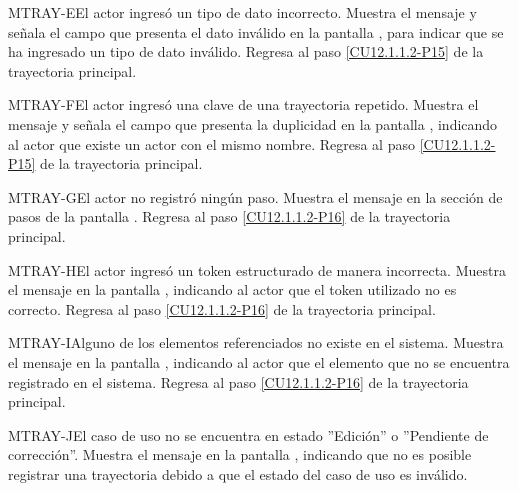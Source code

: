 	\begin{UCtrayectoriaA}{MTRAY-E}{El actor ingresó un tipo de dato incorrecto.}
		\UCpaso[\UCsist] Muestra el mensaje  y señala el campo que presenta el dato inválido en la pantalla , para indicar que se ha ingresado un tipo de dato inválido.
		\UCpaso Regresa al paso \ref{CU12.1.1.2-P15} de la trayectoria principal.
	\end{UCtrayectoriaA}
	
	\begin{UCtrayectoriaA}{MTRAY-F}{El actor ingresó una clave de una trayectoria repetido.}
		\UCpaso[\UCsist] Muestra el mensaje  y señala el campo que presenta la duplicidad en la pantalla , indicando al actor que existe un actor con el mismo nombre.
		\UCpaso Regresa al paso \ref{CU12.1.1.2-P15} de la trayectoria principal.
	\end{UCtrayectoriaA}

	\begin{UCtrayectoriaA}{MTRAY-G}{El actor no registró ningún paso.}
		\UCpaso[\UCsist] Muestra el mensaje  en la sección de pasos de la pantalla .
		\UCpaso Regresa al paso \ref{CU12.1.1.2-P16} de la trayectoria principal.
	\end{UCtrayectoriaA}

	\begin{UCtrayectoriaA}{MTRAY-H}{El actor ingresó un token estructurado de manera incorrecta.}
		\UCpaso[\UCsist] Muestra el mensaje  en la pantalla , indicando al actor que el token utilizado no es correcto.
		\UCpaso Regresa al paso \ref{CU12.1.1.2-P16} de la trayectoria principal.
	\end{UCtrayectoriaA}
	
	\begin{UCtrayectoriaA}{MTRAY-I}{Alguno de los elementos referenciados no existe en el sistema.}
		\UCpaso[\UCsist] Muestra el mensaje  en la pantalla , indicando al actor que el elemento que no se encuentra registrado en el sistema.
		\UCpaso Regresa al paso \ref{CU12.1.1.2-P16} de la trayectoria principal.
	\end{UCtrayectoriaA}

	\begin{UCtrayectoriaA}{MTRAY-J}{El caso de uso no se encuentra en estado ''Edición'' o ''Pendiente de corrección''.}
		\UCpaso[\UCsist] Muestra el mensaje  en la pantalla , indicando que no es posible registrar una trayectoria debido a que el estado del caso de uso es inválido.
	\end{UCtrayectoriaA}


